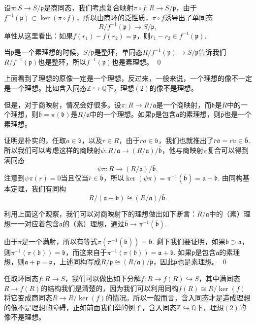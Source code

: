 	设$\pi:S\to S/\mathfrak{p}$是商同态，我们考虑复合映射$\pi\circ f:R\to S/\mathfrak{p}$，由于$f^{-1}(\mathfrak{p})\subset \ker(\pi\circ f)$，所以由商环的泛性质，$\pi\circ f$诱导出了单同态\[R/f^{-1}(\mathfrak{p})\to S/\mathfrak{p},\]
	单性从这里看出：如果$f(r_1)-f(r_2)=\mathfrak{p}$，则$r_1-r_2\in f^{-1}(\mathfrak{p})$. 

	当$\mathfrak{p}$是一个素理想的时候，$S/\mathfrak{p}$是整环，单同态$R/f^{-1}(\mathfrak{p})\to S/\mathfrak{p}$告诉我们$R/f^{-1}(\mathfrak{p})$也是整环，所以$f^{-1}(\mathfrak{p})$也是素理想。
\qed

\para 上面看到了理想的原像一定是一个理想，反过来，一般来说，一个理想的像不一定是一个理想。比如含入同态$\mathbb{Z}\hookrightarrow \mathbb{Q}$下，理想$(2)$的像不是理想。

但是，对于商映射，情况会好很多。设$\pi:R\to R/\mathfrak{a}$是一个商映射，而$\mathfrak{b}$是$R$中的一个理想，则$\bar{\mathfrak{b}}=\pi(\mathfrak{b})$是$R/\mathfrak{a}$中的一个理想。如果$\mathfrak{p}$是包含$\mathfrak{a}$的素理想，则$\bar{\mathfrak{p}}$也是一个素理想。

证明是朴实的，任取$a\in \mathfrak{b}$，以及$r \in R$，由于$ra\in \mathfrak{b}$，我们也就推出了$\bar{r}\bar{a}=\overline{ra}\in \bar{\mathfrak{b}}$. 所以我们可以考虑这样的商映射$\psi: R/\mathfrak{a}\to (R/\mathfrak{a})/\bar{\mathfrak{b}}$，他与商映射$\pi$复合可以得到满同态
\[
	\psi\pi:R\to (R/\mathfrak{a})/\bar{\mathfrak{b}},
\]
注意到$\psi\pi(r)=0$当且仅当$\bar{r}\in \bar{\mathfrak{b}}$，所以$\ker(\psi\pi)=\pi^{-1}(\bar{\mathfrak{b}})=\mathfrak{a}+\mathfrak{b}$. 由同构基本定理，我们有同构
\[
	R/(\mathfrak{a}+\mathfrak{b})\cong (R/\mathfrak{a})/\bar{\mathfrak{b}}.
\]

\para 利用上面这个观察，我们可以对商映射下的理想做出如下断言：$R/\mathfrak{a}$中的（素）理想一一对应着包含$\mathfrak{a}$的（素）理想，通过$\bar{\mathfrak{b}}\to \pi^{-1}(\bar{\mathfrak{b}})$.

\proof 
	由于$\pi$是一个满射，所以有等式$\pi(\pi^{-1}(\bar{\mathfrak{b}}))=\bar{\mathfrak{b}}$. 剩下我们要证明，如果$\mathfrak{b}\supset \mathfrak{a}$，则$\pi^{-1}(\pi(\mathfrak{b}))=\mathfrak{b}$，而这来自于$\pi^{-1}(\pi(\mathfrak{b}))=\mathfrak{a}+\mathfrak{b}$. 如果$\mathfrak{p}$是包含$\mathfrak{a}$的素理想，则$\mathfrak{a}+\mathfrak{p}=\mathfrak{p}$，上述同构写成$R/\mathfrak{p}\cong (R/\mathfrak{a})/\bar{\mathfrak{p}}$，因此$\bar{\mathfrak{p}}$也是素理想。
\qed

\para 任取环同态$f:R\to S$，我们可以做出如下分解$f:R\to f(R)\hookrightarrow S$，其中满同态$R\to f(R)$的结构我们是清楚的，因为我们可以利用同构$f(R)\cong R/\ker(f)$将它变成商同态$R\to R/\ker(f)$的情况。所以一般而言，含入同态才是造成理想的像不是理想的障碍，正如前面我们举的例子，含入同态$\mathbb{Z}\hookrightarrow \mathbb{Q}$下，理想$(2)$的像不是理想。


